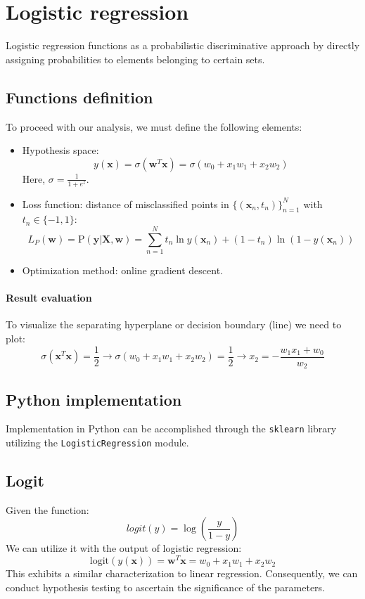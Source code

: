 \section{Logistic regression}

Logistic regression functions as a probabilistic discriminative approach by directly assigning probabilities to elements belonging to certain sets.

\subsection{Functions definition}
To proceed with our analysis, we must define the following elements:
\begin{itemize}
    \item Hypothesis space: 
        \[y(\textbf{x})=\sigma(\textbf{w}^T\textbf{x})=\sigma(w_0+x_1w_1+x_2w_2)\]
        Here, $\sigma=\frac{1}{1+e^{z}}$. 
    \item Loss function: distance of misclassified points in $\{(\textbf{x}_n, t_n)\}^{N}_{n=1}$ with $t_n\in\{-1,1\}$: 
        \[L_P(\textbf{w})=\text{P}(\textbf{y}|\textbf{X},\textbf{w})=\sum_{n=1}^Nt_n\ln y(\textbf{x}_n)+\left(1-t_n\right)\ln(1-y(\textbf{x}_n))\]
    \item Optimization method: online gradient descent.
\end{itemize}

\paragraph*{Result evaluation}
To visualize the separating hyperplane or decision boundary (line) we need to plot:
\[\sigma(\textbf{x}^T\textbf{x}) = \dfrac{1}{2} \rightarrow \sigma(w_0 + x_1w_1 + x_2w_2) = \dfrac{1}{2} \rightarrow x_2=-\dfrac{w_1x_1+w_0}{w_2}\]


\subsection{Python implementation}
Implementation in Python can be accomplished through the \texttt{sklearn} library utilizing the \texttt{LogisticRegression} module.

\subsection{Logit}
Given the function:
\[\textit{logit}(y)=\log\left(\dfrac{y}{1-y}\right)\]
We can utilize it with the output of logistic regression:
\[\text{logit}(y(\textbf{x}))=\textbf{w}^T\textbf{x}=w_0+x_1w_1+x_2w_2\]
This exhibits a similar characterization to linear regression. 
Consequently, we can conduct hypothesis testing to ascertain the significance of the parameters.